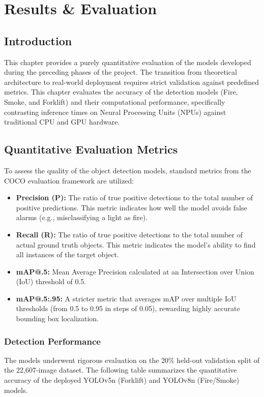 ﻿\chapter{Results \& Evaluation}
\label{chap:evaluation}

\section{Introduction}
This chapter provides a purely quantitative evaluation of the models developed during the preceding phases of the project. The transition from theoretical architecture to real-world deployment requires strict validation against predefined metrics. This chapter evaluates the accuracy of the detection models (Fire, Smoke, and Forklift) and their computational performance, specifically contrasting inference times on Neural Processing Units (NPUs) against traditional CPU and GPU hardware.

\section{Quantitative Evaluation Metrics}
To assess the quality of the object detection models, standard metrics from the COCO evaluation framework are utilized:
\begin{itemize}
    \item \textbf{Precision (P):} The ratio of true positive detections to the total number of positive predictions. This metric indicates how well the model avoids false alarms (e.g., misclassifying a light as fire).
    \item \textbf{Recall (R):} The ratio of true positive detections to the total number of actual ground truth objects. This metric indicates the model's ability to find all instances of the target object.
    \item \textbf{mAP@.5:} Mean Average Precision calculated at an Intersection over Union (IoU) threshold of 0.5.
    \item \textbf{mAP@.5:.95:} A stricter metric that averages mAP over multiple IoU thresholds (from 0.5 to 0.95 in steps of 0.05), rewarding highly accurate bounding box localization.
\end{itemize}

\subsection{Detection Performance}
The models underwent rigorous evaluation on the 20\% held-out validation split of the 22,607-image dataset. The following table summarizes the quantitative accuracy of the deployed YOLOv5n (Forklift) and YOLOv8n (Fire/Smoke) models.

